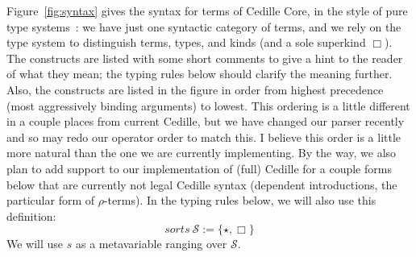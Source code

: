 \documentclass{article}
\begin{document}
Figure~\ref{fig:syntax} gives the syntax for terms of Cedille Core, in
the style of pure type systems~\cite{B92}: we have just one syntactic
category of terms, and we rely on the type system to distinguish
terms, types, and kinds (and a sole superkind $\Box$).  The constructs
are listed with some short comments to give a hint to the reader of
what they mean; the typing rules below should clarify the meaning
further.  Also, the constructs are listed in the figure in order from
highest precedence (most aggressively binding arguments) to lowest.
This ordering is a little different in a couple places from current
Cedille, but we have changed our parser recently and so may redo our
operator order to match this.  I believe this order is a little more
natural than the one we are currently implementing.  By the way, we
also plan to add support to our implementation of (full) Cedille for a
couple forms below that are currently not legal Cedille syntax
(dependent introductions, the particular form of $\rho$-terms).  In
the typing rules below, we will also use this definition:
\[
\textit{sorts}\ \mathcal{S} := \{ \star , \Box \}
\]
\noindent We will use $s$ as a metavariable ranging over $\mathcal{S}$.
\end{document}

